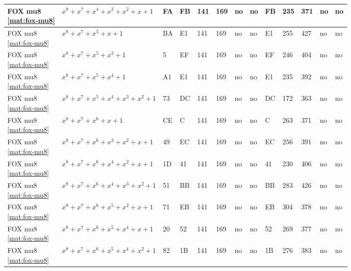 \begin{tiny}
\begin{longtable}{|l|l|l|l|l|l|l|l|l|l|l|l|l|}
\shortstack{FOX mu8 \\ \eqref{mat:fox-mu8}} & $x^8 + x^7 + x^4 + x^3 + x^2 + x + 1$ & FA & FB & 141 & 169 & no & no & FB & 235 & 371 & no & no \\ \hline
\shortstack{FOX mu8 \\ \eqref{mat:fox-mu8}} & $x^8 + x^7 + x^5 + x + 1$ & BA & E1 & 141 & 169 & no & no & E1 & 255 & 427 & no & no \\ \hline
\shortstack{FOX mu8 \\ \eqref{mat:fox-mu8}} & $x^8 + x^7 + x^5 + x^3 + 1$ & 5 & EF & 141 & 169 & no & no & EF & 246 & 404 & no & no \\ \hline
\shortstack{FOX mu8 \\ \eqref{mat:fox-mu8}} & $x^8 + x^7 + x^5 + x^4 + 1$ & A1 & E1 & 141 & 169 & no & no & E1 & 235 & 392 & no & no \\ \hline
\shortstack{FOX mu8 \\ \eqref{mat:fox-mu8}} & $x^8 + x^7 + x^5 + x^4 + x^3 + x^2 + 1$ & 73 & DC & 141 & 169 & no & no & DC & 172 & 363 & no & no \\ \hline
\shortstack{FOX mu8 \\ \eqref{mat:fox-mu8}} & $x^8 + x^7 + x^6 + x + 1$ & CE & C & 141 & 169 & no & no & C & 263 & 371 & no & no \\ \hline
\shortstack{FOX mu8 \\ \eqref{mat:fox-mu8}} & $x^8 + x^7 + x^6 + x^3 + x^2 + x + 1$ & 49 & EC & 141 & 169 & no & no & EC & 256 & 391 & no & no \\ \hline
\shortstack{FOX mu8 \\ \eqref{mat:fox-mu8}} & $x^8 + x^7 + x^6 + x^4 + x^2 + x + 1$ & 1D & 41 & 141 & 169 & no & no & 41 & 230 & 406 & no & no \\ \hline
\shortstack{FOX mu8 \\ \eqref{mat:fox-mu8}} & $x^8 + x^7 + x^6 + x^4 + x^3 + x^2 + 1$ & 51 & BB & 141 & 169 & no & no & BB & 283 & 426 & no & no \\ \hline
\shortstack{FOX mu8 \\ \eqref{mat:fox-mu8}} & $x^8 + x^7 + x^6 + x^5 + x^2 + x + 1$ & 71 & EB & 141 & 169 & no & no & EB & 304 & 378 & no & no \\ \hline
\shortstack{FOX mu8 \\ \eqref{mat:fox-mu8}} & $x^8 + x^7 + x^6 + x^5 + x^4 + x + 1$ & 20 & 52 & 141 & 169 & no & no & 52 & 269 & 377 & no & no \\ \hline
\shortstack{FOX mu8 \\ \eqref{mat:fox-mu8}} & $x^8 + x^7 + x^6 + x^5 + x^4 + x^2 + 1$ & 82 & 1B & 141 & 169 & no & no & 1B & 276 & 383 & no & no \\ \hline

\end{longtable}
\end{tiny}
